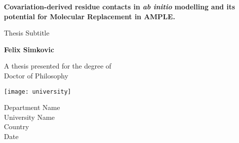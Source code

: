 \begin{titlepage}
    \begin{center}
        \vspace*{1cm}
        
        \Huge
        \textbf{Covariation-derived residue contacts in \textit{ab initio} modelling and its potential for Molecular Replacement in AMPLE.}
        
        \vspace{0.5cm}
        \LARGE
        Thesis Subtitle
        
        \vspace{1.5cm}
        
        \textbf{Felix Simkovic}
        
        \vfill
        
        A thesis presented for the degree of\\
        Doctor of Philosophy
        
        \vspace{0.8cm}
        
        \texttt{[image: university]}
        
        \Large
        Department Name\\
        University Name\\
        Country\\
        Date
        
    \end{center}
\end{titlepage}
